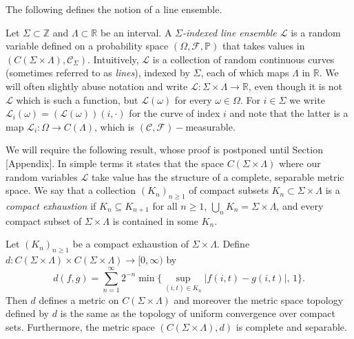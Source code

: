 The following defines the notion of a line ensemble.
\begin{definition}\label{CLEDef}
Let $\Sigma \subset \mathbb{Z}$ and $\Lambda \subset \mathbb{R}$ be an interval. A {\em $\Sigma$-indexed line ensemble $\mathcal{L}$} is a random variable defined on a probability space $(\Omega, \mathcal{F}, \mathbb{P})$ that takes values in $\left(C (\Sigma \times \Lambda), \mathcal{C}_{\Sigma}\right)$. Intuitively, $\mathcal{L}$ is a collection of random continuous curves (sometimes referred to as {\em lines}), indexed by $\Sigma$,  each of which maps $\Lambda$ in $\mathbb{R}$. We will often slightly abuse notation and write $\mathcal{L}: \Sigma \times \Lambda \rightarrow \mathbb{R}$, even though it is not $\mathcal{L}$ which is such a function, but $\mathcal{L}(\omega)$ for every $\omega \in \Omega$. For $i \in \Sigma$ we write $\mathcal{L}_i(\omega) = (\mathcal{L}(\omega))(i, \cdot)$ for the curve of index $i$ and note that the latter is a map $\mathcal{L}_i: \Omega \rightarrow C(\Lambda)$, which is $(\mathcal{C}, \mathcal{F})-$measurable.
\end{definition}

We will require the following result, whose proof is postponed until Section [Appendix]. In simple terms it states that the space $C (\Sigma \times \Lambda)$ where our random variables $\mathcal{L}$ take value has the structure of a complete, separable metric space. We say that a collection $(K_n)_{n\geq 1}$ of compact subsets $K_n\subset\Sigma\times\Lambda$ is a \textit{compact exhaustion} if $K_n\subseteq K_{n+1}$ for all $n\geq 1$, $\bigcup_n K_n = \Sigma\times\Lambda$, and every compact subset of $\Sigma\times\Lambda$ is contained in some $K_n$.
\begin{lemma}\label{Polish} Let $(K_n)_{n\geq 1}$ be a compact exhaustion of $\Sigma\times\Lambda$. Define $d: C (\Sigma \times \Lambda) \times C (\Sigma \times \Lambda) \rightarrow [0, \infty)$ by
\begin{equation} d (f,g) = \sum_{n=1}^\infty 2^{-n}\min\Big\{\sup_{(i,t)\in K_n} |f(i,t) - g(i,t)|, \, 1\Big\}.
\end{equation}
Then $d$ defines a metric on $C (\Sigma \times \Lambda) $ and moreover the metric space topology defined by $d$ is the same as the topology of uniform convergence over compact sets. Furthermore, the metric space $(C (\Sigma \times \Lambda), d)$ is complete and separable.
\end{lemma}

